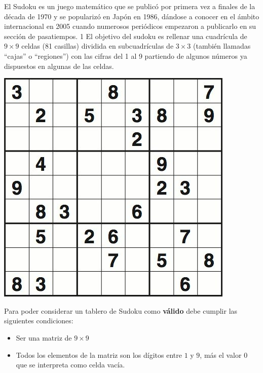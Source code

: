 \documentclass[spanish,a4paper]{article}
\begin{document}



\titulotp

El Sudoku es un juego matem\'atico que se public\'o por primera vez a finales de la d\'ecada de 1970 y se populariz\'o en Jap\'on en 1986, d\'andose a conocer en el \'ambito internacional en 2005 cuando numerosos peri\'odicos empezaron a publicarlo en su secci\'on de pasatiempos. 1 
El objetivo del sudoku es rellenar una cuadrícula de $9 \times 9$ celdas (81 casillas) dividida en subcuadr\'iculas de $3 \times 3$ (también llamadas ``cajas'' o ``regiones'') con las cifras del 1 al 9 partiendo de algunos n\'umeros ya dispuestos en algunas de las celdas.

\begin{center}
	\includegraphics[scale=0.50]{img/sudoku}
\end{center}

Para poder considerar un tablero de Sudoku como \textbf{v\'alido} debe cumplir las siguientes condiciones:
\begin{itemize}
\item Ser una matriz de $9\times 9$
\item Todos los elementos de la matriz son los d\'igitos entre $1$ y $9$, m\'as el valor $0$ que se interpreta como celda vac\'ia.
\end{itemize}
\end{document}
